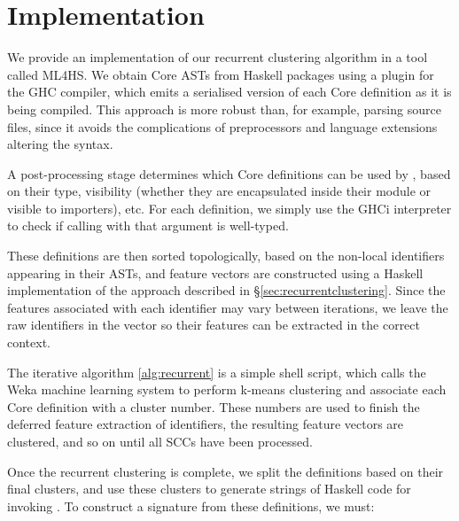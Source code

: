 \section{Implementation}
\label{sec:implementation}

We provide an implementation of our recurrent clustering algorithm in a tool called \textsc{ML4HS}. We obtain Core ASTs from Haskell packages using a plugin for the GHC compiler, which emits a serialised version of each Core definition as it is being compiled. This approach is more robust than, for example, parsing source files, since it avoids the complications of preprocessors and language extensions altering the syntax.

A post-processing stage determines which Core definitions can be used by \qspec{}, based on their type, visibility (whether they are encapsulated inside their module or visible to importers), etc. For each definition, we simply use the GHCi interpreter to check if calling \qspec{} with that argument is well-typed.

These definitions are then sorted topologically, based on the non-local identifiers appearing in their ASTs, and feature vectors are constructed using a Haskell implementation of the approach described in \S \ref{sec:recurrentclustering}. Since the features associated with each identifier may vary between iterations, we leave the raw identifiers in the vector so their features can be extracted in the correct context.

The iterative algorithm \ref{alg:recurrent} is a simple shell script, which calls the Weka machine learning system to perform k-means clustering and associate each Core definition with a cluster number. These numbers are used to finish the deferred feature extraction of identifiers, the resulting feature vectors are clustered, and so on until all SCCs have been processed.

Once the recurrent clustering is complete, we split the definitions based on their final clusters, and use these clusters to generate strings of Haskell code for invoking \qspec{}. To construct a \qspec{} signature from these definitions, we must:

